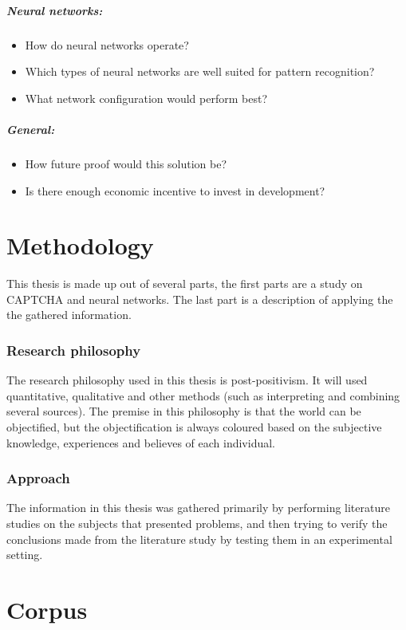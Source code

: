 \documentclass[pdftex,a4paper,12pt,twoside]{report}
\theoremstyle{plain} \newtheorem{theorem}{Theorem} \newtheorem{proposition}{Proposition} \newtheorem{lemma}{Lemma} \newtheorem*{corollary}{Corollary}
\theoremstyle{definition} \newtheorem{definition}{Definition} \newtheorem{conjecture}{Conjecture} \newtheorem*{example}{Example} \newtheorem{algorithm}{Algorithm}
\theoremstyle{remark} \newtheorem*{remark}{Remark} \newtheorem*{note}{Note} \newtheorem{case}{Case}
\begin{document}
\paragraph{Neural networks:}
\begin{itemize}
\item How do neural networks operate?
\item Which types of neural networks are well suited for pattern recognition?
\item What network configuration would perform best?
\end{itemize}
\paragraph{General:}
\begin{itemize}
\item How future proof would this solution be?
\item Is there enough economic incentive to invest in development?
\end{itemize}
\cleardoublepage
\chapter{Methodology}
\label{ch:methodology}
This thesis is made up out of several parts, the first parts are a study on CAPTCHA and neural networks. The last part is a description of applying the the gathered information.
\subsection{Research philosophy}
The research philosophy used in this thesis is post-positivism. It will used quantitative, qualitative and other methods (such as interpreting and combining several sources). The premise in this philosophy is that the world can be objectified, but the objectification is always coloured based on the subjective knowledge, experiences and believes of each individual.
\subsection{Approach}
The information in this thesis was gathered primarily by performing literature studies on the subjects that presented problems, and then trying to verify the conclusions made from the literature study by testing them in an experimental setting.
\cleardoublepage
\chapter{Corpus}
\label{ch:corpus}
\end{document}
